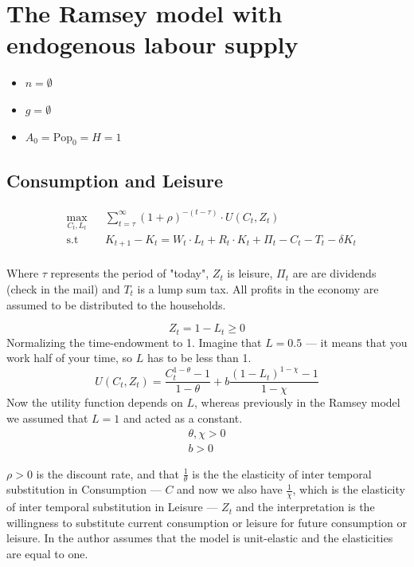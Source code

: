 \section{The Ramsey model with endogenous labour supply}
\begin{itemize}
    \item $n = \emptyset$
    \item $g = \emptyset$
    \item $A_0 = \text{Pop}_0 = H = 1$
\end{itemize}

\subsection{Consumption and Leisure}
\begin{equation*}
\begin{aligned}
& \underset{C_t, L_t}{\max}
& & \sum_{t = \tau }^{\infty} (1 + \rho)^{-(t - \tau)} \cdot U(C_t, Z_t) \\
& \text{s.t}
& & K_{t+1} - {K_t} = W_t \cdot L_t + R_t \cdot K_t + \Pi_t - C_t - T_t - \delta K_t \\
\end{aligned}
\end{equation*}

Where $\tau$ represents the period of "today", $Z_t$ is leisure, $\Pi_t$ are are dividends (check in the mail) and $T_t$ is a lump sum tax. All profits in the economy are assumed to be distributed to the households. 

\begin{equation}
Z _ { t } = 1 - L_{ t } \geq 0
\end{equation}
Normalizing the time-endowment to 1. Imagine that $L=0.5$ --- it means that you work half of your time, so $L$ has to be less than 1. 
\begin{equation}
    U(C_t, Z_t) = \frac{C_t^{1 - \theta} - 1}{1 - \theta} + b \frac{(1 - L_t)^{1 - \chi} - 1}{1 - \chi}
\end{equation}
Now the utility function depends on $L$, whereas previously in the Ramsey model we assumed that $L = 1$ and acted as a constant.
\begin{align*}
\theta , \chi > 0 \\
b > 0
\end{align*}

 $\rho > 0$ is the discount rate, and that $\frac{1}{\theta}$
is the the elasticity of inter temporal substitution in Consumption --- $C$ and now we also have $\frac{1}{\chi}$, which is the elasticity of inter temporal substitution in Leisure --- $Z_t$ and the interpretation is the willingness to substitute current consumption or leisure for future consumption or leisure. In \textcite{romer_advanced_2012}
the author assumes that the model is unit-elastic and the elasticities are equal to one. 

